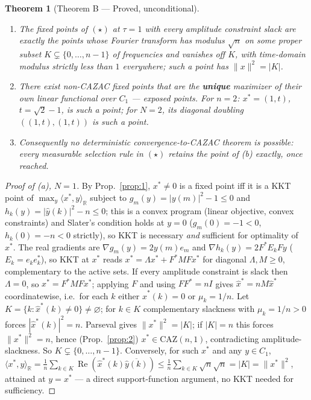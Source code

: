 \documentclass[11pt]{article}
\theoremstyle{plain}
\newtheorem{theorem}{Theorem}[section]
\theoremstyle{definition}
\theoremstyle{remark}
\newcommand{\R}{\mathbb R}
\newcommand{\CAZ}{\mathrm{CAZ}}
\newcommand{\re}{\operatorname{Re}}
\begin{document}
\begin{theorem}[Theorem B --- Proved, unconditional]\label{thm:B}
\begin{enumerate}
\item[\rm(a)] The fixed points of $(\star)$ at $\tau=1$ with every
amplitude constraint slack are exactly the points whose Fourier transform
has modulus $\sqrt n$ on some proper subset $K\subsetneq\{0,\dots,n-1\}$ of
frequencies and vanishes off $K$, with time-domain modulus strictly less
than $1$ everywhere; such a point has $\|x\|^2=|K|$.
\item[\rm(b)] There exist non-CAZAC fixed points that are the
\textbf{unique} maximizer of their own linear functional over $C_1$ ---
exposed points. For $n=2$: $x^*=(1,t)$, $t=\sqrt2-1$, is such a point; for
$N=2$, its diagonal doubling $((1,t),(1,t))$ is such a point.
\item[\rm(c)] Consequently no deterministic convergence-to-CAZAC theorem
is possible: every measurable selection rule in $(\star)$ retains the
point of (b) exactly, once reached.
\end{enumerate}
\end{theorem}
\begin{proof}[Proof of (a), $N=1$]
By Prop.~\ref{prop:1}, $x^*\ne0$ is a fixed point iff it is a KKT point of
$\max_y\langle x^*,y\rangle_\R$ subject to $g_m(y)=|y(m)|^2-1\le0$ and
$h_k(y)=|\widehat y(k)|^2-n\le0$; this is a convex program (linear
objective, convex constraints) and Slater's condition holds at $y=0$
($g_m(0)=-1<0$, $h_k(0)=-n<0$ strictly), so KKT is necessary \emph{and}
sufficient for optimality of $x^*$. The real gradients are
$\nabla g_m(y)=2y(m)e_m$ and $\nabla h_k(y)=2F^*E_kFy$ ($E_k=e_ke_k^*$), so
KKT at $x^*$ reads $x^*=\Lambda x^*+F^*MFx^*$ for diagonal $\Lambda,M\ge0$,
complementary to the active sets. If every amplitude constraint is slack
then $\Lambda=0$, so $x^*=F^*MFx^*$; applying $F$ and using $FF^*=nI$
gives $\widehat x^*=nM\widehat x^*$ coordinatewise, i.e.\ for each $k$
either $\widehat x^*(k)=0$ or $\mu_k=1/n$. Let
$K=\{k:\widehat x^*(k)\ne0\}\ne\varnothing$; for $k\in K$ complementary
slackness with $\mu_k=1/n>0$ forces $|\widehat x^*(k)|^2=n$. Parseval gives
$\|x^*\|^2=|K|$; if $|K|=n$ this forces $\|x^*\|^2=n$, hence
(Prop.~\ref{prop:2}) $x^*\in\CAZ(n,1)$, contradicting amplitude-slackness.
So $K\subsetneq\{0,\dots,n-1\}$.
Conversely, for such $x^*$ and any $y\in C_1$,
$\langle x^*,y\rangle_\R=\tfrac1n\sum_{k\in K}\re(\widehat x^*(k)\overline{\widehat y(k)})\le\tfrac1n\sum_{k\in K}\sqrt n\sqrt n=|K|=\|x^*\|^2$,
attained at $y=x^*$ --- a direct support-function argument, no KKT needed
for sufficiency.
\end{proof}
\end{document}
